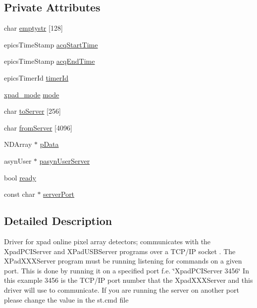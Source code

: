 \subsection*{\-Private \-Attributes}
\begin{DoxyCompactItemize}
\item 
char \hyperlink{classxpad_a421021783f2a42b2006d47747670b90a}{emptystr} \mbox{[}128\mbox{]}
\item 
epics\-Time\-Stamp \hyperlink{classxpad_a9abf8c53880f5277a9c8a62074a3709a}{acq\-Start\-Time}
\item 
epics\-Time\-Stamp \hyperlink{classxpad_af7d78280f3004beb8930b19bba9a206f}{acq\-End\-Time}
\item 
epics\-Timer\-Id \hyperlink{classxpad_ac3aa333c231dc3f8a811a2301a3db32c}{timer\-Id}
\item 
\hyperlink{xpad_8cpp_a622a04a516a79d400d871fb688e3dd96}{xpad\-\_\-mode} \hyperlink{classxpad_a7b04fa77731f4940fe6de23021e23105}{mode}
\item 
char \hyperlink{classxpad_add9855faa308738d97cfc8cae9c29831}{to\-Server} \mbox{[}256\mbox{]}
\item 
char \hyperlink{classxpad_a2df91f1005b18ed37258aa15b667f6d3}{from\-Server} \mbox{[}4096\mbox{]}
\item 
\-N\-D\-Array $\ast$ \hyperlink{classxpad_afd5a1434a37a88e59c50cd4efcd807af}{p\-Data}
\item 
asyn\-User $\ast$ \hyperlink{classxpad_af165532e4b31b84e3efec3d2b1052727}{pasyn\-User\-Server}
\item 
bool \hyperlink{classxpad_a6429424bf4137e8f3e9896c67721a1db}{ready}
\item 
const char $\ast$ \hyperlink{classxpad_a965f7dd05153aa6d99ba9a3a8e0e9db8}{server\-Port}
\end{DoxyCompactItemize}


\subsection{\-Detailed \-Description}
\-Driver for xpad online pixel array detectors; communicates with the \-Xpad\-P\-C\-I\-Server and \-X\-Pad\-U\-S\-B\-Server programs over a \-T\-C\-P/\-I\-P socket . \-The \-X\-Pad\-X\-X\-X\-Server program must be running listening for commands on a given port. \-This is done by running it on a specified port f.\-e. \char`\"{}\-Xpad\-P\-C\-I\-Server 3456\char`\"{} \-In this example 3456 is the \-T\-C\-P/\-I\-P port number that the \-Xpad\-X\-X\-X\-Server and this driver will use to communicate. \-If you are running the server on another port please change the value in the st.\-cmd file 


